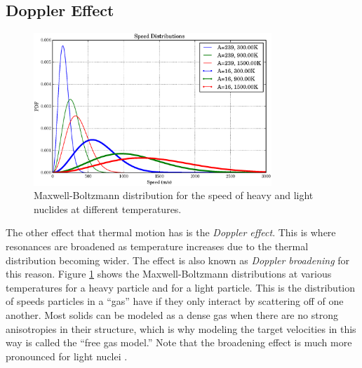 \subsection{Doppler Effect}

\begin{figure}[h!]
  \centering
    \includegraphics[width=0.8\textwidth]{graphics/MB_dist.eps}
     \caption{Maxwell-Boltzmann distribution for the speed of heavy and light nuclides at different temperatures.   \label{MB_dist}}
\end{figure}

The other effect that thermal motion has is the \emph{Doppler effect}.  This is where resonances are broadened as temperature increases due to the thermal distribution becoming wider.  The effect is also known as \emph{Doppler broadening} for this reason.  Figure \ref{MB_dist} shows the Maxwell-Boltzmann distributions at various temperatures for a heavy particle and for a light particle.  This is the distribution of speeds particles in a ``gas'' have if they only interact by scattering off of one another.  Most solids can be modeled as a dense gas when there are no strong anisotropies in their structure, which is why modeling the target velocities in this way is called the ``free gas model.''  Note that the broadening effect is much more pronounced for light nuclei \cite{duderstadt}.  %

